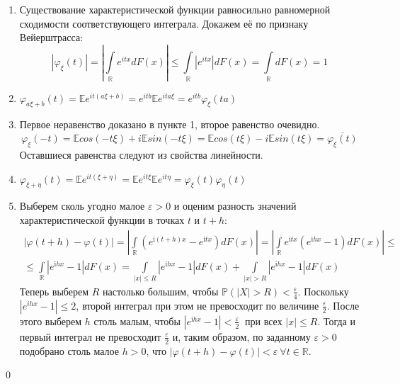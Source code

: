 \documentclass[oneside,final,14pt]{extreport}
\renewenvironment{proof}{{\bfseries Доказательство.}}{\qed}
\theoremstyle{plain}
\theoremstyle{definition}
\theoremstyle{named}
\begin{document}
\begin{proof}
    \begin{enumerate}
        \item Существование характеристической функции равносильно равномерной сходимости соответствующего интеграла. Докажем её по признаку Вейерштрасса:
        \begin{equation*}
            \left|\varphi_{\xi}(t)\right|=\left|\int\limits_{\mathbb{R}} e^{i t x} d F(x)\right| \leqslant \int\limits_{\mathbb{R}}\left|e^{i t x}\right| d F(x)=\int\limits_{\mathbb{R}} d F(x)=1
        \end{equation*}
        \item $\varphi_{a \xi+b}(t) 
        = \mathbb{E}e^{i t(a \xi+b)}
        = e^{i t b} \mathbb{E}e^{i t a \xi}
        = e^{i t b} \varphi_{\xi}(t a)$
        \item Первое неравенство доказано в пункте 1, второе равенство очевидно.
        \begin{equation*}
            \varphi_{\xi}(-t) = \mathbb{E}cos(-t \xi) + i\mathbb{E}sin(-t \xi) = \mathbb{E}cos(t \xi) - i\mathbb{E}sin(t \xi) = \overline{\varphi_{\xi}(t)}
        \end{equation*}
        Оставшиеся равенства следуют из свойства линейности.
        \item $\varphi_{\xi + \eta}(t) 
        = \mathbb{E}e^{it(\xi + \eta)} 
        = \mathbb{E}e^{it\xi}\mathbb{E}e^{it\eta}
        = \varphi_{\xi}(t)\varphi_{\eta}(t)$
        \item Выберем сколь угодно малое $\varepsilon > 0$ и оценим разность значений характеристической функции в точках $t$ и $t + h$:
        \begin{multline*}
            |\varphi(t+h)-\varphi(t)| 
            = \left|\int\limits_{\mathbb{R}} \left(e^{\mathrm{i}(t+h) x}-e^{\mathrm{i} tx}\right) d F(x)\right|
            = \left|\int\limits_{\mathbb{R}} e^{\mathrm{i} t x}\left(e^{\mathrm{i} h x}-1\right) d F(x)\right| \leqslant \\
            \leqslant \int\limits_{\mathbb{R}} \left|e^{\mathrm{i} h x}-1\right| d F(x)=\int\limits_{|x| \leqslant R}\left|e^{\mathrm{i} h x}-1\right| d F(x)+\int\limits_{|x|>R}\left|e^{\mathrm{i} h x}-1\right| d F(x)
        \end{multline*}
        Теперь выберем $R$ настолько большим, чтобы $\mathbb{P}(|X|>R) < \frac{\varepsilon}{4}$. Поскольку $\left|e^{i h x}-1\right| \leqslant 2$, второй интеграл при этом не превосходит по величине $\frac{\varepsilon}{2}$. После этого выберем $h$ столь малым, чтобы $\left|e^{\mathrm{i} h x}-1\right|<\frac{\varepsilon}{2}~$ при всех $|x| \leqslant R$. Тогда и первый интеграл не превосходит $\frac{\varepsilon}{2}$ и, таким образом, по заданному $\varepsilon > 0$ подобрано столь малое $h >0$, что $|\varphi(t+h)-\varphi(t)|<\varepsilon~ \forall t \in \mathbb{R}$.

\end{enumerate}
\end{proof}
\end{document}

